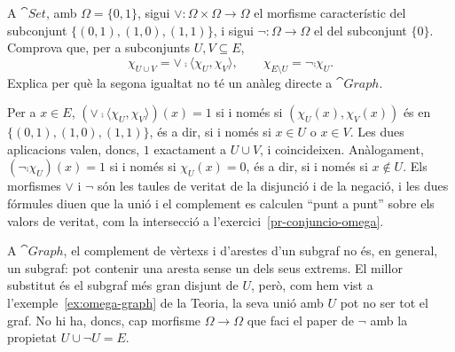 \begin{exercici}\label{pr-disjuncio-negacio-set}
A $\cat{Set}$, amb $\Omega=\{0,1\}$, sigui ${\vee}\colon\Omega\times\Omega\to\Omega$ el morfisme característic del subconjunt $\{(0,1),(1,0),(1,1)\}$, i sigui $\neg\colon\Omega\to\Omega$ el del subconjunt $\{0\}$. Comprova que, per a subconjunts $U,V\subseteq E$,
\[
\chi_{U\cup V}={\vee}\comp\langle\chi_U,\chi_V\rangle,
\qquad
\chi_{E\setminus U}=\neg\comp\chi_U.
\]
Explica per què la segona igualtat no té un anàleg directe a $\cat{Graph}$.
\end{exercici}

\begin{solucio}
Per a $x\in E$, $({\vee}\comp\langle\chi_U,\chi_V\rangle)(x)=1$ si i només si $(\chi_U(x),\chi_V(x))$ és en $\{(0,1),(1,0),(1,1)\}$, és a dir, si i només si $x\in U$ o $x\in V$. Les dues aplicacions valen, doncs, $1$ exactament a $U\cup V$, i coincideixen. Anàlogament, $(\neg\comp\chi_U)(x)=1$ si i només si $\chi_U(x)=0$, és a dir, si i només si $x\notin U$. Els morfismes $\vee$ i $\neg$ són les taules de veritat de la disjunció i de la negació, i les dues fórmules diuen que la unió i el complement es calculen \enquote{punt a punt} sobre els valors de veritat, com la intersecció a l'exercici~\ref{pr-conjuncio-omega}.

A $\cat{Graph}$, el complement de vèrtexs i d'arestes d'un subgraf no és, en general, un subgraf: pot contenir una aresta sense un dels seus extrems. El millor substitut és el subgraf més gran disjunt de $U$, però, com hem vist a l'exemple~\ref{ex:omega-graph} de la Teoria, la seva unió amb $U$ pot no ser tot el graf. No hi ha, doncs, cap morfisme $\Omega\to\Omega$ que faci el paper de $\neg$ amb la propietat $U\cup\neg U=E$.
\end{solucio}
